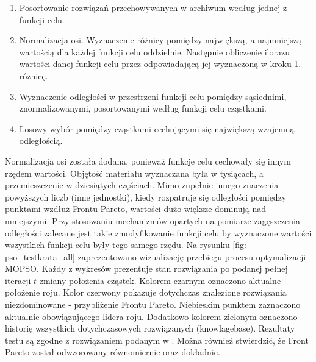 \begin{enumerate}[noitemsep]
	\item Posortowanie rozwiązań przechowywanych w archiwum według jednej z funkcji celu.
	\item Normalizacja osi. Wyznaczenie różnicy pomiędzy największą, a najmniejszą wartością dla każdej funkcji celu oddzielnie. Następnie obliczenie ilorazu wartości danej funkcji celu przez odpowiadającą jej wyznaczoną w kroku 1. różnicę.
	\item Wyznaczenie odległości w przestrzeni funkcji celu pomiędzy sąsiednimi, znormalizowanymi, posortowanymi według funkcji celu cząstkami.
	\item Losowy wybór pomiędzy cząstkami cechującymi się największą wzajemną odległością.
\end{enumerate}
Normalizacja osi została dodana, ponieważ funkcje celu cechowały się innym rzędem wartości. Objętość materiału wyznaczana była w tysiącach, a przemieszczenie w dziesiątych częściach. Mimo zupełnie innego znaczenia powyższych liczb (inne jednostki), kiedy rozpatruje się odległości pomiędzy punktami wzdłuż Frontu Pareto, wartości dużo większe dominują nad mniejszymi. Przy stosowaniu mechanizmów opartych na pomiarze zagęszczenia i odległości zalecane jest takie zmodyfikowanie funkcji celu by wyznaczone wartości wszystkich funkcji celu były tego samego rzędu.
Na rysunku \ref{fig: pso_testkrata_all} zaprezentowano wizualizację przebiegu procesu optymalizacji MOPSO. Każdy z wykresów prezentuje stan rozwiązania po podanej pełnej iteracji $t$ zmiany położenia cząstek. Kolorem czarnym oznaczono aktualne położenie roju. Kolor czerwony pokazuje dotychczas znalezione rozwiązania niezdominowane - przybliżenie Frontu Pareto. Niebieskim punktem zaznaczono aktualnie obowiązującego lidera roju. Dodatkowo kolorem zielonym oznaczono historię wszystkich dotychczasowych rozwiązanych (knowlagebase). Rezultaty testu są zgodne z rozwiązaniem podanym w \parencite{Zavala2014}. Można również stwierdzić, że Front Pareto został odwzorowany równomiernie oraz dokładnie.


